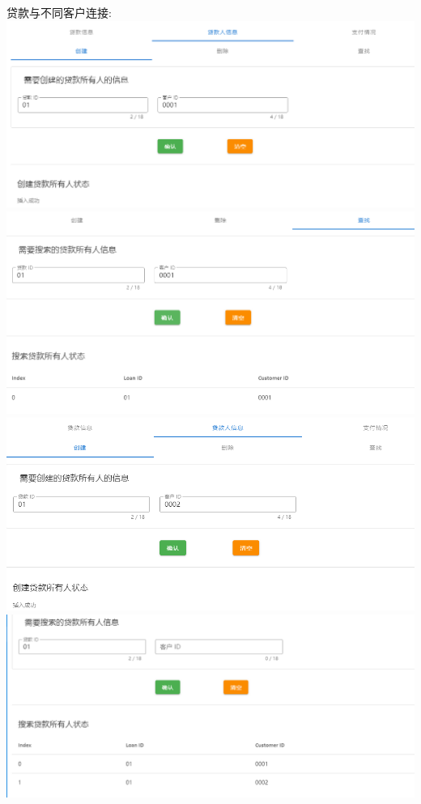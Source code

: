 \documentclass{article}
\begin{document}
	贷款与不同客户连接:\\
	\includegraphics*[scale=0.4]{14.png}\\
	\includegraphics*[scale=0.4]{15.png}\\
	\includegraphics*[scale=0.4]{19.png}\\
	\includegraphics*[scale=0.4]{20.png}\\
\end{document}
